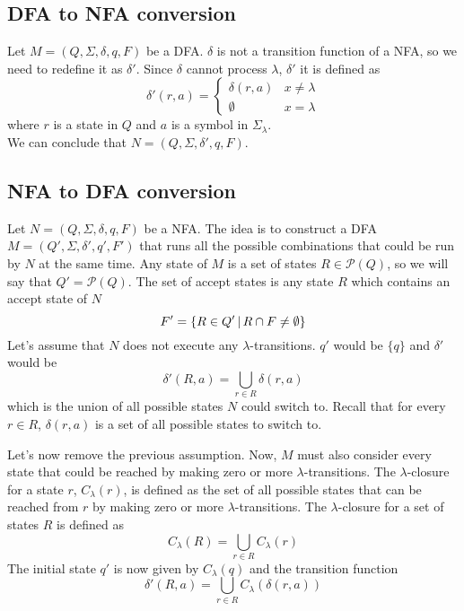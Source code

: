 \documentclass{article}
\newcommand{\emptyString}{\lambda}
\begin{document}
\subsection{DFA to NFA conversion}

Let \(M=(Q, \Sigma, \delta, q, F)\) be a DFA.
\(\delta\) is not a transition function of a NFA, so we need to redefine it as \(\delta'\).
Since \(\delta\) cannot process \(\emptyString\), \(\delta'\)
it is defined as
\[
    \delta'(r, a)=
    \begin{cases} 
        \delta(r, a) & x \neq \emptyString \\
        \emptyset & x = \emptyString
    \end{cases}
\]
where \(r\) is a state in \(Q\) and \(a\) is a symbol in \(\Sigma_\emptyString\). \\
We can conclude that \(N=(Q, \Sigma, \delta', q, F)\).

\subsection{NFA to DFA conversion}

Let \(N=(Q, \Sigma, \delta, q, F)\) be a NFA. The idea is to construct a DFA \(M=(Q', \Sigma, \delta', q', F')\)
that runs all the possible combinations that could be run by \(N\) at the same time.
Any state of \(M\) is a set of states \(R \in \mathcal{P}(Q)\), so we will say that
\(Q'=\mathcal{P}(Q)\). The set of accept states is any state \(R\) which contains an accept
state of \(N\)
\[
    F' = \{R \in Q' \,|\, R \cap F \neq \emptyset\}
\]
Let's assume that \(N\) does not execute any \(\emptyString\)-transitions.
\(q'\) would be \(\{q\}\) and \(\delta'\) would be
\[
    \delta'(R, a) = \bigcup_{r\in R}\delta(r,a)
\]
which is the union of all possible states \(N\) could switch to.
Recall that for every \(r\in R\), \(\delta(r,a)\) is a set
of all possible states to switch to.

Let's now remove the previous assumption. Now, \(M\)
must also consider every state that could be reached by
making zero or more \(\emptyString\)-transitions.
The \(\emptyString\)-closure
for a state \(r\), \(C_\emptyString(r)\), is defined as
the set of all possible states that can be reached from \(r\) by making
zero or more \(\emptyString\)-transitions.
The \(\emptyString\)-closure for a set of states \(R\) is defined as
\[
    C_\emptyString(R) = \bigcup_{r\in R}C_\emptyString(r)
\]
The initial state \(q'\) is now given by \(C_\emptyString(q)\)
and the transition function
\[
    \delta'(R, a) = \bigcup_{r\in R}C_\emptyString(\delta(r, a))
\]
\end{document}

